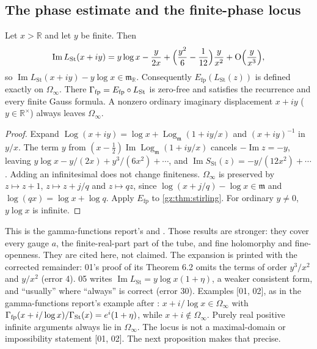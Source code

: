 \documentclass[11pt,a4paper]{article}
\numberwithin{equation}{section}
\theoremstyle{definition}
\theoremstyle{remark}
\newcommand{\R}{\mathbb R}
\newcommand{\mm}{\mathfrak m}
\renewcommand{\Im}{\operatorname{Im}}
\newcommand{\Log}{\operatorname{Log}}
\newcommand{\Lgm}{\operatorname{Log}_{\mm}}
\newcommand{\Efp}{E_{\mathrm{fp}}}
\newcommand{\LSt}{L_{\mathrm{St}}}
\newcommand{\GSt}{\Gamma_{\mathrm{St}}}
\newcommand{\SSt}{S_{\mathrm{St}}}
\newcommand{\Om}{\Omega_{\infty}}
\newcommand{\src}[1]{\textup{[#1]}}
\newcommand{\bigO}{\mathrm{O}}
\begin{document}
\subsection{The phase estimate and the finite-phase locus}\label{gz:sec:phasedomain}
\begin{proposition}[Phase estimate \src{01, 02, 03, 04, 05, 06}]\label{gz:prop:phase}
Let $x>\R$ and let $y$ be finite. Then
\[
\Im\LSt(x+iy)=y\log x-\frac y{2x}+\Bigl(\frac{y^2}6-\frac1{12}\Bigr)\frac y{x^2}+\bigO\Bigl(\frac y{x^3}\Bigr),
\]
so $\Im\LSt(x+iy)-y\log x\in\mm_\R$. Consequently $\Efp(\LSt(z))$ is defined
exactly on $\Om$. There $\Gamma_{\rm fp}=\Efp\circ\LSt$ is zero-free and
satisfies the recurrence and every finite Gauss formula. A nonzero ordinary
imaginary displacement $x+iy$ ($y\in\R^\times$) always leaves $\Om$.
\end{proposition}
\begin{proof}
Expand $\Log(x+iy)=\log x+\Lgm(1+iy/x)$ and $(x+iy)^{-1}$ in $y/x$. The term
$y$ from $(x-\tfrac12)\Im\Lgm(1+iy/x)$ cancels $-\Im z=-y$, leaving
$y\log x-y/(2x)+y^3/(6x^2)+\cdots$, and $\Im\SSt(z)=-y/(12x^2)+\cdots$.
Adding an infinitesimal does not change finiteness. $\Om$ is preserved by
$z\mapsto z+1$, $z\mapsto z+j/q$ and $z\mapsto qz$, since
$\log(x+j/q)-\log x\in\mm$ and $\log(qx)=\log x+\log q$. Apply $\Efp$ to
\cref{gz:thm:stirling}. For ordinary $y\ne0$, $y\log x$ is infinite.
\end{proof}
This is the gamma-functions report's  and .
Those results are stronger: they cover every gauge $a$, the finite-real-part
part of the tube, and fine holomorphy and fine-openness. They are cited
here, not claimed. The expansion is printed with the corrected remainder:
01's proof of its Theorem 6.2 omits the terms of order $y^3/x^2$ and
$y/x^2$ (error 4). 05 writes $\Im\LSt=y\log x(1+\eta)$, a weaker consistent
form, and ``usually'' where ``always'' is correct (error 30). Examples
\src{01, 02}, as in the gamma-functions report's example after
: $x+i/\log x\in\Om$ with
$\Gamma_{\rm fp}(x+i/\log x)/\GSt(x)=e^i(1+\eta)$, while $x+i\notin\Om$.
Purely real positive infinite arguments always lie in $\Om$. The locus is
not a maximal-domain or impossibility statement \src{01, 02}. The next
proposition makes that precise.
\end{document}
